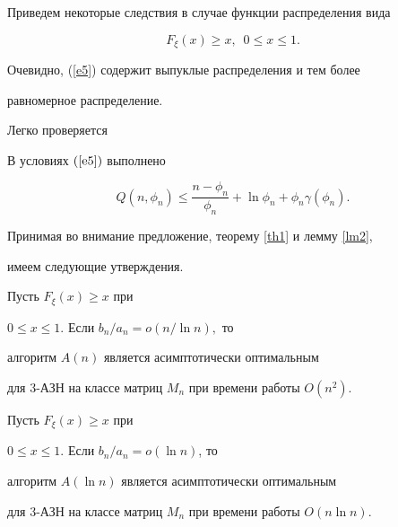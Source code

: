 Приведем некоторые следствия в случае функции распределения вида


\begin{equation}


\label {e5}


F_{\xi}(x) \ge x,\ \; 0 \leq x \leq 1.


\end{equation}


Очевидно, (\ref{e5}) содержит выпуклые распределения и тем более


равномерное распределение.





Легко проверяется





\begin{lem}


\label{lm2}


В условиях $(\ref{e5})$ выполнено


$$


Q(n, \phi_n) \le \frac{n-\phi_n}{\phi_n} + \ln \phi_n + \phi_n \gamma(\phi_n).


$$


\end{lem}





Принимая во внимание предложение, теорему \ref {th1} и лемму \ref{lm2},


имеем следующие утверждения.


 


\begin{cor}


Пусть $F_{\xi}(x) \ge x$ при 


$0 \leq x \leq 1$. Если $ b_n / a_n = o (n / \ln n ) ,$ то


алгоритм $ {A}(n) $ является асимптотически оптимальным


для 3-АЗН на классе матриц $M_n$ при времени работы $O(n^2)$.


\end{cor}





\begin{cor}


Пусть $F_{\xi}(x) \ge x$ при 


$0 \leq x \leq 1$. Если $b_n / a_n = o (\ln n)$, то


алгоритм ${A}(\ln n) $ является асимптотически оптимальным


для 3-АЗН на классе матриц $M_n$ при времени работы $O(n \ln n)$.


\end{cor}





